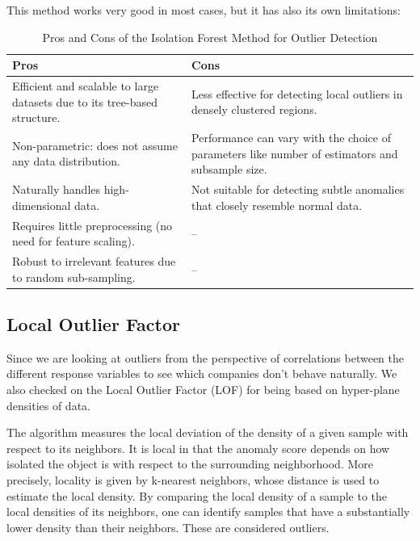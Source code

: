 \documentclass[11pt,english,a4paper,hidelinks]{book}
\begin{document}
\noindent This method works very good in most cases, but it has also its own limitations:

\begin{table}[H]
    \centering
    \begin{tabular}{|p{7cm}|p{7cm}|}
    \hline
    \textbf{Pros} & \textbf{Cons} \\
    \hline
    Efficient and scalable to large datasets due to its tree-based structure. & Less effective for detecting local outliers in densely clustered regions. \\
    \hline
    Non-parametric: does not assume any data distribution. & Performance can vary with the choice of parameters like number of estimators and subsample size. \\
    \hline
    Naturally handles high-dimensional data. & Not suitable for detecting subtle anomalies that closely resemble normal data. \\
    \hline
    Requires little preprocessing (no need for feature scaling). & -- \\
    \hline
    Robust to irrelevant features due to random sub-sampling. & -- \\
    \hline
    \end{tabular}
    \caption{Pros and Cons of the Isolation Forest Method for Outlier Detection}
\end{table}

\subsection{Local Outlier Factor}

Since we are looking at outliers from the perspective of correlations between the different response variables to see which companies don't behave naturally. We also checked on the Local Outlier Factor (LOF) for being based on hyper-plane densities of data.

\vspace{0.5cm}
\noindent The algorithm measures the local deviation of the density of a given sample with respect to its neighbors. It is local in that the anomaly score depends on how isolated the object is with respect to the surrounding neighborhood. More precisely, locality is given by k-nearest neighbors, whose distance is used to estimate the local density. By comparing the local density of a sample to the local densities of its neighbors, one can identify samples that have a substantially lower density than their neighbors. These are considered outliers. \textcite{breunig2000lof}
\end{document}
